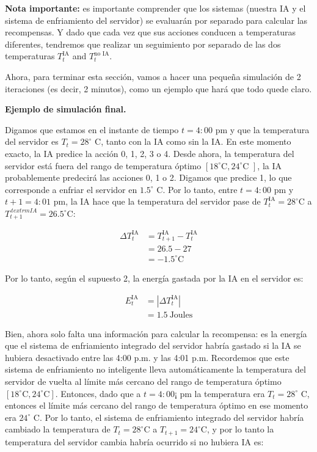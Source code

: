 \documentclass[
]{book}
\begin{document}
\textbf{Nota importante:} es importante comprender que los sistemas (nuestra IA y el sistema de enfriamiento del servidor) se evaluarán por separado para calcular las recompensas. Y dado que cada vez que sus acciones conducen a temperaturas diferentes, tendremos que realizar un seguimiento por separado de las dos temperaturas \(T_t^{\textrm{IA}}\) and \(T_t^{\textrm{no IA}}\).

Ahora, para terminar esta sección, vamos a hacer una pequeña simulación de 2 iteraciones (es decir, 2 minutos), como un ejemplo que hará que todo quede claro.

\textbf{Ejemplo de simulación final.}

Digamos que estamos en el instante de tiempo \(t = 4:00\) pm y que la temperatura del servidor es \(T_t = 28^\circ\) C, tanto con la IA como sin la IA. En este momento exacto, la IA predice la acción 0, 1, 2, 3 o 4. Desde ahora, la temperatura del servidor está fuera del rango de temperatura óptimo \([18^{\circ} \textrm{C}, 24^{\circ} \textrm{C }]\), la IA probablemente predecirá las acciones 0, 1 o 2. Digamos que predice 1, lo que corresponde a enfriar el servidor en \(1.5^{\circ}\) C. Por lo tanto, entre \(t = 4:00\) pm y \(t + 1 = 4: 01\) pm, la IA hace que la temperatura del servidor pase de \(T_t^{\textrm{IA}} = 28^{\circ} \textrm{C}\) a \(T_{t + 1}^{\ textrm{IA}} = 26.5^{\circ} \textrm{C}\):

\begin{align*}
    \Delta T_t^{\textrm{IA}}
    & = T_{t+1}^{\textrm{IA}} - T_t^{\textrm{IA}} \\
    & = 26.5 - 27 \\
    & = -1.5^{\circ} \textrm{C}
\end{align*}

Por lo tanto, según el supuesto 2, la energía gastada por la IA en el servidor es:

\begin{align*}
    E_t^{\textrm{IA}}
    & = |\Delta T_t^{\textrm{IA}}| \\
    & = 1.5 \ \textrm{Joules}
\end{align*}

Bien, ahora solo falta una información para calcular la recompensa: es la energía que el sistema de enfriamiento integrado del servidor habría gastado si la IA se hubiera desactivado entre las 4:00 p.m. y las 4:01 p.m. Recordemos que este sistema de enfriamiento no inteligente lleva automáticamente la temperatura del servidor de vuelta al límite más cercano del rango de temperatura óptimo \([18^{\circ} \textrm{C}, 24^{\circ} \textrm{C}]\). Entonces, dado que a \(t = 4: 00 ¡\) pm la temperatura era \(T_t = 28^{\circ}\) C, entonces el límite más cercano del rango de temperatura óptimo en ese momento era \(24^{\circ}\) C. Por lo tanto, el sistema de enfriamiento integrado del servidor habría cambiado la temperatura de \(T_t = 28^{\circ} \textrm{C}\) a \(T_{t + 1} = 24^{\circ} \textrm{C}\), y por lo tanto la temperatura del servidor cambia habría ocurrido si no hubiera IA es:
\end{document}
